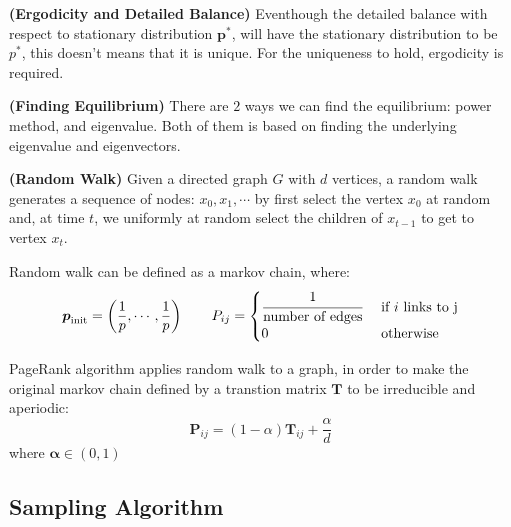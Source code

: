 \begin{remark}{\textbf{(Ergodicity and Detailed Balance)}}
    Eventhough the detailed balance with respect to stationary distribution $\boldsymbol p^*$, will have the stationary distribution to be $p^*$, this doesn't means that it is unique. For the uniqueness to hold, ergodicity is required. 
\end{remark}

\begin{remark}{\textbf{(Finding Equilibrium)}}
    There are $2$ ways we can find the equilibrium: power method, and eigenvalue. Both of them is based on finding the underlying eigenvalue and eigenvectors.
\end{remark}

\begin{definition}{\textbf{(Random Walk)}}
    Given a directed graph $G$ with $d$ vertices, a random walk generates a sequence of nodes: $x_0, x_1,\cdots$ by first select the vertex $x_0$ at random and, at time $t$, we uniformly at random select the children of $x_{t-1}$ to get to vertex $x_t$. 
\end{definition}

\begin{remark}
    Random walk can be defined as a markov chain, where:
    \begin{equation*}
        \boldsymbol p_\text{init} = \bracka{\frac{1}{p},\cdots,\frac{1}{p}} \qquad P_{ij} = \begin{cases}
            \cfrac{1}{\text{number of edges}} & \text{ if } i \text{ links to } $j$ \\
            0 & \text{ otherwise }
        \end{cases}
    \end{equation*}
\end{remark}

\begin{remark}
    PageRank algorithm applies random walk to a graph, in order to make the original markov chain defined by a transtion matrix $\boldsymbol T$ to be irreducible and aperiodic:
    \begin{equation*}
        \boldsymbol P_{ij} = (1-\alpha)\boldsymbol T_{ij} + \frac{\alpha}{d}
    \end{equation*}
    where $\boldsymbol \alpha \in (0, 1)$
\end{remark}

\subsection{Sampling Algorithm}

